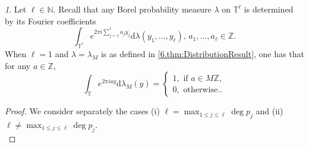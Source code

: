 \documentclass[11pt,american,preprint]{elsarticle}
\numberwithin{equation}{section}
\theoremstyle{plain}
\theoremstyle{plain*}
\theoremstyle{plain}
\theoremstyle{plain*}
\theoremstyle{plain}
\theoremstyle{plain*}
\theoremstyle{remark}
\theoremstyle{remark*}
\theoremstyle{remark}
\newtheorem{rem}[thm]{\protect\remarkname}
\theoremstyle{remark*}
\theoremstyle{remark}
\theoremstyle{remark*}
\theoremstyle{plain}
\theoremstyle{definition}
\theoremstyle{plain}
\theoremstyle{plain} %
\providecommand{\remarkname}{Remark}
\newcommand{\N}{\mathbb{N}}
\newcommand{\Z}{\mathbb{Z}}
\begin{document}
\begin{rem}\label{6.rem:FourierCoefficients}
Let $\ell\in\N$. Recall that any Borel probability measure $\lambda$ on $\mathbb T^\ell$ is determined by its Fourier coefficients 
$$
\int_{\mathbb T^\ell} e^{2\pi i \sum_{j=1}^\ell a_jy_j}\text{d}\lambda(y_1,...,y_\ell),\,a_1,...,a_\ell\in\Z.
$$
When $\ell=1$ and $\lambda=\lambda_M$ is as defined in \cref{6.thm:DistributionResult}, one has that for any $a\in\Z$,
$$
\int_{\mathbb T} e^{2\pi i ay}\text{d}\lambda_M(y)=\begin{cases}
    1,\text{ if }a\in M\Z,\\
    0,\text{ otherwise.}.
\end{cases}
$$
\end{rem}
\begin{proof}
We  consider separately the cases (i) $\ell=\max_{1\leq j\leq \ell}\deg p_j$ and (ii)  $\ell\neq\max_{1\leq j\leq \ell}\deg p_j$. \\


\end{proof}
\end{document}
